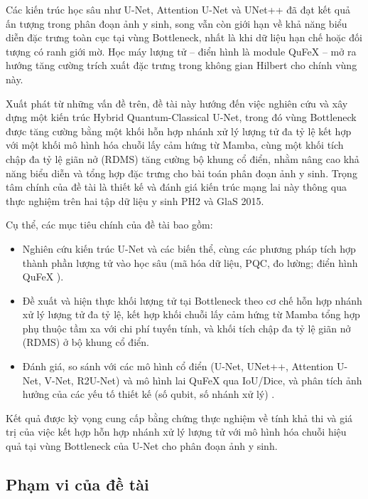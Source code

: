\documentclass[14pt]{article}  %
\begin{document}
{    %
    Các kiến trúc học sâu như U-Net, Attention U-Net và UNet++ đã đạt kết quả ấn tượng trong phân đoạn ảnh y sinh, song vẫn còn giới hạn về khả năng biểu diễn đặc trưng toàn cục tại vùng Bottleneck, nhất là khi dữ liệu hạn chế hoặc đối tượng có ranh giới mờ. Học máy lượng tử -- điển hình là module QuFeX \cite{qufex2025} -- mở ra hướng tăng cường trích xuất đặc trưng trong không gian Hilbert cho chính vùng này.

    Xuất phát từ những vấn đề trên, đề tài này hướng đến việc nghiên cứu và xây dựng một kiến trúc Hybrid Quantum-Classical U-Net, trong đó vùng Bottleneck được tăng cường bằng một khối hỗn hợp nhánh xử lý lượng tử đa tỷ lệ kết hợp với một khối mô hình hóa chuỗi lấy cảm hứng từ Mamba, cùng một khối tích chập đa tỷ lệ giãn nở (RDMS) tăng cường bộ khung cổ điển, nhằm nâng cao khả năng biểu diễn và tổng hợp đặc trưng cho bài toán phân đoạn ảnh y sinh. Trọng tâm chính của đề tài là thiết kế và đánh giá kiến trúc mạng lai này thông qua thực nghiệm trên hai tập dữ liệu y sinh PH2 và GlaS 2015.

    Cụ thể, các mục tiêu chính của đề tài bao gồm:
    \begin{itemize}
        \item Nghiên cứu kiến trúc U-Net và các biến thể, cùng các phương pháp tích hợp thành phần lượng tử vào học sâu (mã hóa dữ liệu, PQC, đo lường; điển hình QuFeX \cite{qufex2025}).
        \item Đề xuất và hiện thực khối lượng tử tại Bottleneck theo cơ chế hỗn hợp nhánh xử lý lượng tử đa tỷ lệ, kết hợp khối chuỗi lấy cảm hứng từ Mamba \cite{gu2023mamba} tổng hợp phụ thuộc tầm xa với chi phí tuyến tính, và khối tích chập đa tỷ lệ giãn nở (RDMS) ở bộ khung cổ điển.
        \item Đánh giá, so sánh với các mô hình cổ điển (U-Net, UNet++, Attention U-Net, V-Net, R2U-Net) và mô hình lai QuFeX qua IoU/Dice, và phân tích ảnh hưởng của các yếu tố thiết kế (số qubit, số nhánh xử lý) \cite{du2025qmltutorial}.
    \end{itemize}

    Kết quả được kỳ vọng cung cấp bằng chứng thực nghiệm về tính khả thi và giá trị của việc kết hợp hỗn hợp nhánh xử lý lượng tử với mô hình hóa chuỗi hiệu quả tại vùng Bottleneck của U-Net cho phân đoạn ảnh y sinh.

    \subsection{Phạm vi của đề tài}

}
\end{document}
